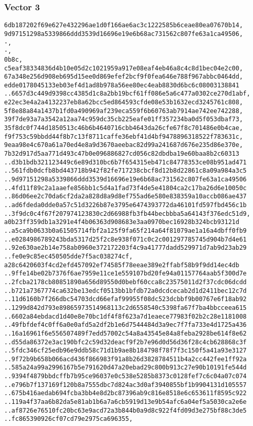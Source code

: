\documentclass[
]{article}
\begin{document}
\hypertarget{vector-3-2}{%
\subsubsection{Vector 3}\label{vector-3-2}}

\begin{verbatim}
6db187202f69e627e432296ae1d0f166ae6ac3c1222585b6ceae80ea07670b14,
9d97151298a5339866ddd3539d16696e19e6b68ac731562c807fe63a1ca49506,
-,
-,
0b8c,
c5eaf38334836d4b10e05d2c1021959a917e08eaf4eb46a8c4c8d1bec04e2c00,
67a348e256d908eb695d15ee0d869efef2bcf9f0fea646e788f967abbc0464dd,
edde0178045133eb03ef4d1ad8b978a56ee80ec4eab8830d6bc6c08003138841
..6657d3c449d9398cc4385d1c8a2bb19bcf61ff086e5a6c477a0302ce270d1abf,
e22ec3e4a2a4132237eb8a62bcc5ed864593cfde08e53b1632ecd3245761c808,
5f8e88a84a1437b1fd0a490969af239eca559f6b60763ab7914ae742ee742288,
39f7de93a7a3542a12aa74c959dc35cb225eafe01ff357234ba0d5f053dbaf73,
35f8dc0f744d1850513c46b6b4640716cbb4643da26cfe67f8c701486e0b4cae,
f9f753c59bbdd44f8b7c13f8711caffe36ebf41d4bf9478896318522f783631c,
9eaa98e4c670a61a70ed4e8a9d3670aeebac82d99a241687d676e235d86e370e,
7b32d917d5aa771d493c47b0e096886827cd056c82dbdba19e60baa8b2c60313
..d3b1bdb321123449c6e89d310bc6b7f654315eb471c84778353ce08b951ad471
..561fdb0dcfb8bd443718b942f82fe717238cbcf8d12b8d22861c8a09a984a3c5
..9d97151298a5339866ddd3539d16696e19e6b68ac731562c807fe63a1ca49506
..4fd11f89c2a1aaefe856bb1c5d4a1fad73f4de5e41804ca2c17ba26d6e10050c
..86d06ee2c70da6cf2da2a828d8a9d8ef755ad6e580e838359a10accb086ae437
..ad6fdeda0dde0a57c51d3226b87e3795e6474393772da46101fd597fbd456c1b
..3f9dc0c4f67f207974123830c2d66988fb3fb44becbbba5a64143f376edc51d9,
a0b23ff359db1a3291e4f4b06363d908683e3aa0970bec16928b324bcb93121d
..a5ca9b0633b0a61505714fbf2a125f9fa65f214a64f81079ae1a16a4dbff0fb9
..e0284986789243bda5317d25f2c8e938f071c0c2c001297785745d904b7d4e61
..92e630ae2b14e758ab0960e372172203f4c9a41777dadd529971d7ab9d23ab29
..fe0e9c85ec450505dde7f5ac038274cf,
a28c6420603f4cd2efd457092ef74585f78eeae389e2ffabf58b9f9dd14ec4db
..9ffe14be02b7376f6ae7959e11ce1e559107bd20fe94a01157764aab5f300d7e
..2fcba2178cb80851890a656d89550d0bebf60cca8c23575011d2f37cdc06dcdd
..b721a7367774ca632be13edcf0513bb1bfdb72a0dcdcecab2d1d2411bec12c7d
..11d6160b7f266dbc54703dcd66efaf99955f08dc523dcbbf9b00767e6f18ab92
..1299d842d793e89865973514968113c2d6558540c5398fa67f7ba4bbcceea615
..6602a84ebdacd1d40e8e70bc1df4f8f623a7d1eaece77983f02b2c28e1181008
..49fbfdef4c0ff6a0e0afd5a2df2b1e6d7544484d3a9ec7f7fa733e4d1725a436
..16a16961f6e556507489f7edd57002c54a8a43545e84a8feba2928be614f8e62
..d55da86372e3ac190bfc2c59d32deacf9f2b7e96d0d56d36f28c4cb628868c3f
..5fdc346cf25edb96e9ddb58c71d1b9ae8b184798f78f7f3c150f5a41a93e3127
..9f72b9b658b066acd436f866983f91a8b26d3828784511b4a2cc442fee1ff92a
..585a24a99a2996167b5e791620d47a20ebad29c800b913c27e90b10191fe544d
..9394f4879bbdcffb7b95ce96037e0c538e5285b8373c0128fef7c6c04a07c074
..e796b7f137169f120b8a7555dbc7d824ac3d0af3940855bf1b9904131d105557
..675b416aedab694fcba3bb4e8d2bc87396ab9c816e8518e6c653611f8595c922
..119a4f37aa6b82da5e81ab1b6a7a6cb5919d13e9b54afc6a04ef5a5030ca2e6e
..af8726e76510fc20bc63e9acd72a3b844b0a9d8c922f4fd09d3e275bf88c3de5
..fc865390926cf07cd79e2975ca696355,
\end{verbatim}
\end{document}
